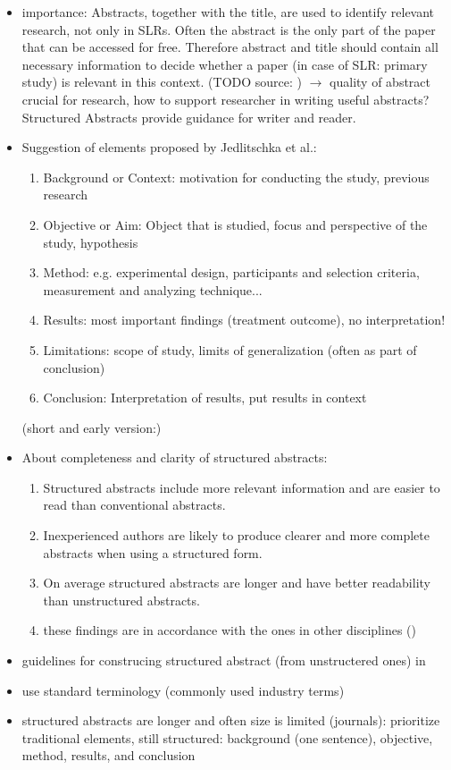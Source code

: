 \begin{itemize}
\item importance: Abstracts, together with the title, are used to identify relevant research, not only in SLRs. Often the abstract is the only part of the paper that can be accessed for free. Therefore abstract and title should contain all necessary information to decide whether a paper (in case of SLR: primary study) is relevant in this context. (TODO source: )
	$\rightarrow$ quality of abstract crucial for research, how to support researcher in writing useful abstracts? Structured Abstracts provide guidance for writer and reader. 
\item Suggestion of elements proposed by Jedlitschka et al.\cite{Jedlitschka2008}: 
	\begin{enumerate}
		\item Background or Context: motivation for conducting the study, previous research
		\item Objective or Aim: Object that is studied, focus and perspective of the study, hypothesis
		\item Method: e.g. experimental design, participants and selection criteria, measurement and analyzing technique...
		\item Results: most important findings (treatment outcome), no interpretation!
		\item Limitations: scope of study, limits of generalization (often as part of conclusion)
		\item Conclusion: Interpretation of results, put results in context
	\end{enumerate}
	(short and early version:\cite{Jedlitschka2005})
\item About completeness and clarity of structured abstracts:
	\begin{enumerate}
	\item Structured abstracts include more relevant information and are easier to read than conventional abstracts. \cite{Budgen2008} \cite{Budgen2007}
	\item Inexperienced authors are likely to produce clearer and more complete abstracts when using a structured form.\cite{Budgen2011} 
	\item On average structured abstracts are longer and have better readability than unstructured abstracts. \cite{KBO2008}
	\item these findings are in accordance with the ones in other disciplines ()
	\end{enumerate}
\item guidelines for construcing structured abstract (from unstructered ones) in \cite{KBO2008}
\item use standard terminology (commonly used industry terms) \cite{Jedlitschka2008}
\item structured abstracts are longer and often size is limited (journals): prioritize traditional elements, still structured: background (one sentence), objective, method, results, and conclusion \cite{Jedlitschka2008}
\end{itemize}